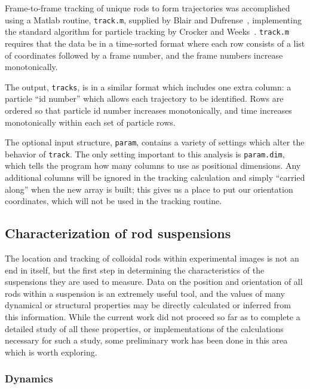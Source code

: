 Frame-to-frame tracking of unique rods to form trajectories was accomplished using a Matlab routine, \texttt{track.m}, 
supplied by Blair and Dufrense~\cite{blair-matlab}, implementing the standard algorithm for particle tracking by
Crocker and Weeks~\cite{crocker-tracking}.  \texttt{track.m} requires that the data be in a time-sorted format where each
row consists of a list of coordinates followed by a frame number, and the frame numbers increase monotonically.

The output, \texttt{tracks}, is in a similar format which includes one extra column: a particle ``id number'' which
allows each trajectory to be identified. Rows are ordered so that particle id number increases monotonically, and
time increases monotonically within each set of particle rows.

The optional input structure, \texttt{param}, contains a variety of settings which alter the behavior of 
\texttt{track}.  The only setting important to this analysis is \texttt{param.dim}, which tells the program how
many columns to use as positional dimensions. Any additional columns will be ignored in the tracking calculation and 
simply ``carried along'' when the new array is built; this gives us a place to put our orientation coordinates, which
will not be used in the tracking routine.

\subsection{Characterization of rod suspensions}

The location and tracking of colloidal rods within experimental images is not an end in itself, but the
first step in determining the characteristics of the suspensions they are used to measure.  Data on the 
position and orientation of all rods within a suspension is an extremely useful tool, and the values of many
dynamical or structural properties may be directly calculated or inferred from this information.
While the current work did not proceed so far as to complete a detailed study of all these properties, or 
implementations of the calculations necessary for such a study, some preliminary work has been done in this
area which is worth exploring.

\subsubsection{Dynamics}


